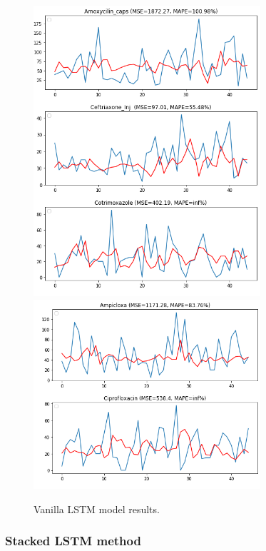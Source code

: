 \documentclass[12pt]{report}
\begin{document}
  \begin{figure}[H]%
  \begin {center}
  \includegraphics[width=0.75\textwidth]{images/vanilla1 (2).png}
  \includegraphics[width=0.75\textwidth]{images/vanilla1 (4).png}
  \caption{Vanilla LSTM model results.}
  \label{fig:ecg}
  \end {center}
  \end{figure}
  
  
 

  \subsubsection{Stacked LSTM method}
\end{document}
